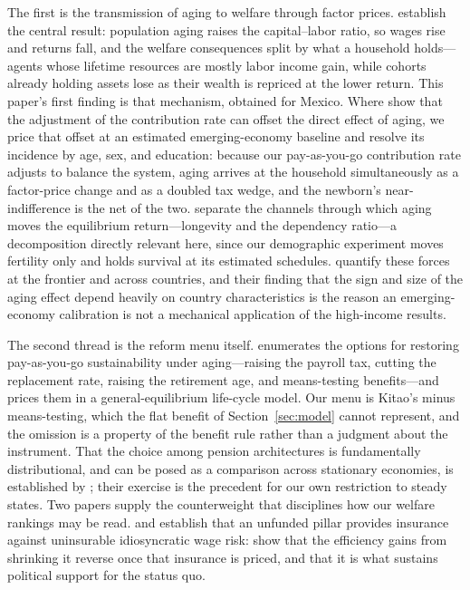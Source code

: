 \documentclass[12pt,a4paper]{article}
\begin{document}
The first is the transmission of aging to welfare through factor prices.
\citet{KruegerLudwig2007} establish the central result: population aging raises
the capital--labor ratio, so wages rise and returns fall, and the welfare
consequences split by what a household holds---agents whose lifetime resources
are mostly labor income gain, while cohorts already holding assets lose as their
wealth is repriced at the lower return. This paper's first finding is that mechanism, obtained for Mexico. Where \citet{KruegerLudwig2007} show that the adjustment of the contribution rate can offset the direct effect of aging, we price that offset at an estimated emerging-economy baseline and resolve its incidence by age, sex, and education: because our pay-as-you-go contribution rate adjusts to balance the system, aging arrives at the household simultaneously as a factor-price change and as a doubled tax wedge, and the newborn's near-indifference is the net of the two. \citet{CarvalhoFerreroNechio2016} separate the channels through
which aging moves the equilibrium return---longevity and the dependency ratio---a decomposition directly relevant here, since our
demographic experiment moves fertility only and holds survival at its estimated
schedules. \citet{AuclertEtAl2021} quantify these forces at the frontier and
across countries, and their finding that the sign and size of the aging effect
depend heavily on country characteristics is the reason an emerging-economy
calibration is not a mechanical application of the high-income results.

The second thread is the reform menu itself. \citet{Kitao2014} enumerates the
options for restoring pay-as-you-go sustainability under aging---raising the
payroll tax, cutting the replacement rate, raising the retirement age, and
means-testing benefits---and prices them in a general-equilibrium life-cycle
model. Our menu is Kitao's minus means-testing, which the flat benefit of
Section~\ref{sec:model} cannot represent, and the omission is a property of the
benefit rule rather than a judgment about the instrument. That the choice among
pension architectures is fundamentally distributional, and can be posed as a
comparison across stationary economies, is established by
\citet{HuggettVentura1999}; their exercise is the precedent for our own
restriction to steady states. Two papers supply the counterweight that
disciplines how our welfare rankings may be read.
\citet{ConesaKrueger1999} and \citet{NishiyamaSmetters2007} establish that an unfunded pillar provides insurance against uninsurable idiosyncratic wage risk: \citet{NishiyamaSmetters2007} show that the efficiency gains from shrinking it reverse once that insurance is priced, and \citet{ConesaKrueger1999} that it is what sustains political support for the status quo.
\end{document}
